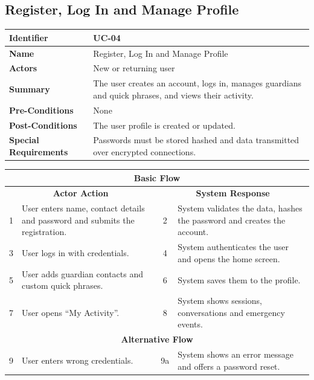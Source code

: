\documentclass{FastFyp}
\begin{document}
\subsection{Register, Log In and Manage Profile}
\begin{table}[H]
\centering
\renewcommand{\arraystretch}{1.3}
\begin{tabularx}{\textwidth}{|l|X|}
\hline
\textbf{Identifier} & UC-04 \\ \hline
\textbf{Name} & Register, Log In and Manage Profile \\ \hline
\textbf{Actors} & New or returning user \\ \hline
\textbf{Summary} & The user creates an account, logs in, manages guardians and quick phrases, and views their activity. \\ \hline
\textbf{Pre-Conditions} & None \\ \hline
\textbf{Post-Conditions} & The user profile is created or updated. \\ \hline
\textbf{Special Requirements} & Passwords must be stored hashed and data transmitted over encrypted connections. \\ \hline
\end{tabularx}

\vspace{-\arrayrulewidth}
\begin{tabularx}{\textwidth}{|c|X|c|X|}
\hline
\multicolumn{4}{|c|}{\textbf{Basic Flow}} \\ \hline
\multicolumn{2}{|c|}{\textbf{Actor Action}} & \multicolumn{2}{c|}{\textbf{System Response}} \\ \hline
1 & User enters name, contact details and password and submits the registration. & 2 & System validates the data, hashes the password and creates the account. \\ \hline
3 & User logs in with credentials. & 4 & System authenticates the user and opens the home screen. \\ \hline
5 & User adds guardian contacts and custom quick phrases. & 6 & System saves them to the profile. \\ \hline
7 & User opens ``My Activity''. & 8 & System shows sessions, conversations and emergency events. \\ \hline
\multicolumn{4}{|c|}{\textbf{Alternative Flow}} \\ \hline
9 & User enters wrong credentials. & 9a & System shows an error message and offers a password reset. \\ \hline
\end{tabularx}
\end{table}
\end{document}
